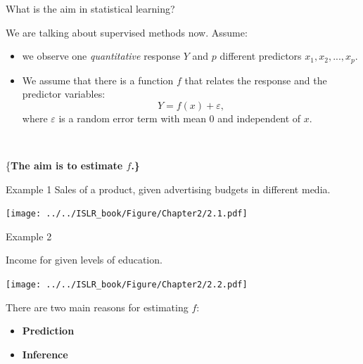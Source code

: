 \documentclass[
  ignorenonframetext,
]{beamer}
\providecommand{\tightlist}{%
  \setlength{\itemsep}{0pt}\setlength{\parskip}{0pt}}
\begin{document}
\begin{frame}
\begin{block}{What is the aim in statistical learning?}
\protect\hypertarget{what-is-the-aim-in-statistical-learning}{}
\vspace{3mm}

We are talking about supervised methods now. Assume:

\vspace{2mm}

\begin{itemize}
\tightlist
\item
  we observe one \emph{quantitative} response \(Y\) and \(p\) different
  predictors \(x_1, x_2,... , x_p\).
\end{itemize}

\vspace{1mm}

\begin{itemize}
\tightlist
\item
  We assume that there is a function \(f\) that relates the response and
  the predictor variables: \[ Y = f(x) + \varepsilon,\] where
  \(\varepsilon\) is a random error term with mean 0 and independent of
  \(x\).
\end{itemize}

\(~\)

\centering

\{\bf The aim is to estimate $f$.\}
\end{block}
\end{frame}

\begin{frame}{Example 1}
\protect\hypertarget{example-1}{}
Sales of a product, given advertising budgets in different media.

\texttt{[image: ../../ISLR\_book/Figure/Chapter2/2.1.pdf]}
\end{frame}

\begin{frame}{Example 2}
\protect\hypertarget{example-2}{}
\vspace{4mm}

Income for given levels of education.

\texttt{[image: ../../ISLR\_book/Figure/Chapter2/2.2.pdf]}
\end{frame}

\begin{frame}
There are two main reasons for estimating \(f\):

\begin{itemize}
\item
  \textbf{Prediction}
\item
  \textbf{Inference}
\end{itemize}
\end{frame}
\end{document}
